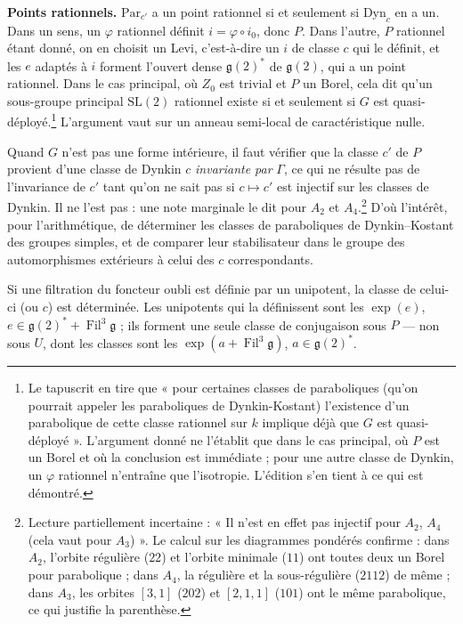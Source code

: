 \documentclass[11pt,a4paper]{article}
\begin{document}
\textbf{Points rationnels.} $\mathrm{Par}_{c'}$ a un point rationnel si et
seulement si $\mathrm{Dyn}_{c}$ en a un. Dans un sens, un $\varphi$ rationnel
définit $i=\varphi\circ i_{0}$, donc $P$. Dans l'autre, $P$ rationnel étant
donné, on en choisit un Levi, c'est-à-dire un $i$ de classe $c$ qui le définit,
et les $e$ adaptés à $i$ forment l'ouvert dense $\mathfrak{g}(2)^{*}$ de
$\mathfrak{g}(2)$, qui a un point rationnel. Dans le cas principal, où
$Z_{0}$ est trivial et $P$ un Borel, cela dit qu'un sous-groupe principal
$\mathrm{SL}(2)$ rationnel existe si et seulement si $G$ est
quasi-déployé.\footnote{Le tapuscrit en tire que « pour certaines classes de
paraboliques (qu'on pourrait appeler les paraboliques de Dynkin-Kostant)
l'existence d'un parabolique de cette classe rationnel sur $k$ implique déjà
que $G$ est quasi-déployé ». L'argument donné ne l'établit que dans le cas
principal, où $P$ est un Borel et où la conclusion est immédiate ; pour une
autre classe de Dynkin, un $\varphi$ rationnel n'entraîne que l'isotropie.
L'édition s'en tient à ce qui est démontré.} L'argument vaut sur un anneau
semi-local de caractéristique nulle.

Quand $G$ n'est pas une forme intérieure, il faut vérifier que la classe $c'$
de $P$ provient d'une classe de Dynkin $c$ \emph{invariante par} $\Gamma$, ce
qui ne résulte pas de l'invariance de $c'$ tant qu'on ne sait pas si $c\mapsto
c'$ est injectif sur les classes de Dynkin. Il ne l'est pas : une note marginale
le dit pour $A_{2}$ et $A_{4}$.\footnote{Lecture partiellement incertaine :
« Il n'est en effet pas injectif pour $A_{2}$, $A_{4}$ (cela vaut pour
$A_{3}$) ». Le calcul sur les diagrammes pondérés confirme : dans $A_{2}$,
l'orbite régulière ($22$) et l'orbite minimale ($11$) ont toutes deux un Borel
pour parabolique ; dans $A_{4}$, la régulière et la sous-régulière ($2112$) de
même ; dans $A_{3}$, les orbites $[3,1]$ ($202$) et $[2,1,1]$ ($101$) ont le
même parabolique, ce qui justifie la parenthèse.} D'où l'intérêt, pour
l'arithmétique, de déterminer les classes de paraboliques de Dynkin--Kostant des
groupes simples, et de comparer leur stabilisateur dans le groupe des
automorphismes extérieurs à celui des $c$ correspondants.

Si une filtration du foncteur oubli est définie par un unipotent, la classe de
celui-ci (ou $c$) est déterminée. Les unipotents qui la définissent sont les
$\exp(e)$, $e\in\mathfrak{g}(2)^{*}+\operatorname{Fil}^{3}\mathfrak{g}$ ; ils
forment une seule classe de conjugaison sous $P$ — non sous $U$, dont les
classes sont les $\exp(a+\operatorname{Fil}^{3}\mathfrak{g})$,
$a\in\mathfrak{g}(2)^{*}$.
\end{document}
